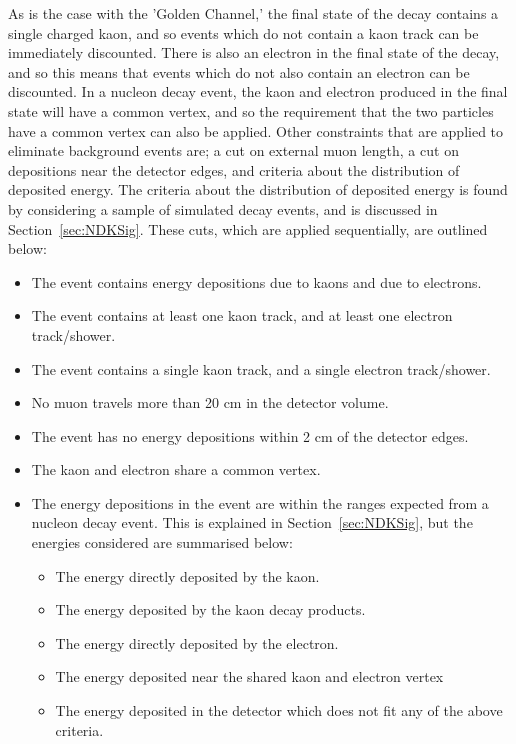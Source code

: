 As is the case with the 'Golden Channel,' the final state of the decay contains a single charged kaon, and so events which do not contain a kaon track can be immediately discounted. There is also an electron in the final state of the decay, and so this means that events which do not also contain an electron can be discounted. In a nucleon decay event, the kaon and electron produced in the final state will have a common vertex, and so the requirement that the two particles have a common vertex can also be applied. Other constraints that are applied to eliminate background events are; a cut on external muon length, a cut on depositions near the detector edges, and criteria about the distribution of deposited energy. The criteria about the distribution of deposited energy is found by considering a sample of simulated decay events, and is discussed in Section~\ref{sec:NDKSig}. These cuts, which are applied sequentially, are outlined below:
\begin{itemize}
\item The event contains energy depositions due to kaons and due to electrons.
\item The event contains at least one kaon track, and at least one electron track/shower.
\item The event contains a single kaon track, and a single electron track/shower.
\item No muon travels more than 20 cm in the detector volume.
\item The event has no energy depositions within 2 cm of the detector edges.
\item The kaon and electron share a common vertex.
\item The energy depositions in the event are within the ranges expected from a nucleon decay event. This is explained in Section~\ref{sec:NDKSig}, but the energies considered are summarised below:
  \begin{itemize}
  \item The energy directly deposited by the kaon.
  \item The energy deposited by the kaon decay products.
  \item The energy directly deposited by the electron.
  \item The energy deposited near the shared kaon and electron vertex
  \item The energy deposited in the detector which does not fit any of the above criteria.
  \end{itemize}
\end{itemize}
